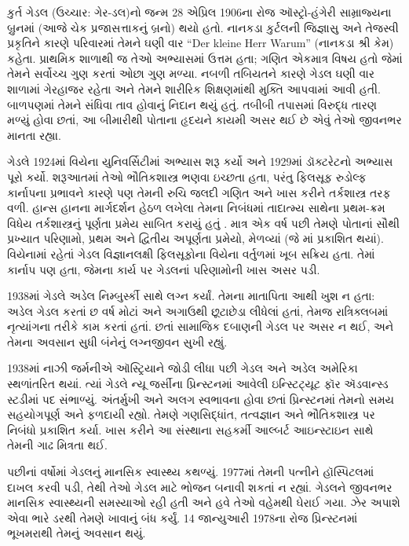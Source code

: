 \begingroup
\makeatletter{}\makeatother


\label{guunit:OLP-0625}



કુર્ત ગેડલ (ઉચ્ચાર: ગેર-ડલ)નો જન્મ 28 એપ્રિલ
1906ના રોજ ઑસ્ટ્રો-હંગેરી સામ્રાજ્યના બ્રુનમાં
(આજે ચેક પ્રજાસત્તાકનું બ્રનો) થયો હતો. નાનકડા
કુર્ટલની જિજ્ઞાસુ અને તેજસ્વી પ્રકૃતિને કારણે
પરિવારમાં તેમને ઘણી વાર “Der kleine Herr Warum”
(નાનકડા શ્રી કેમ) કહેતા. પ્રાથમિક શાળાથી જ
તેઓ અભ્યાસમાં ઉત્તમ હતા; ગણિત એકમાત્ર વિષય
હતો જેમાં તેમને સર્વોચ્ચ ગુણ કરતાં ઓછા ગુણ
મળ્યા. નબળી તબિયતને કારણે ગેડલ ઘણી વાર
શાળામાં ગેરહાજર રહેતા અને તેમને શારીરિક
શિક્ષણમાંથી મુક્તિ આપવામાં આવી હતી. બાળપણમાં
તેમને સંધિવા તાવ હોવાનું નિદાન થયું હતું.
તબીબી તપાસમાં વિરુદ્ધ તારણ મળ્યું હોવા
છતાં, આ બીમારીથી પોતાના હૃદયને કાયમી
અસર થઈ છે એવું તેઓ જીવનભર માનતા રહ્યા.

ગેડલે 1924માં વિયેના યુનિવર્સિટીમાં અભ્યાસ
શરૂ કર્યો અને 1929માં ડૉક્ટરેટનો અભ્યાસ
પૂરો કર્યો. શરૂઆતમાં તેઓ ભૌતિકશાસ્ત્ર
ભણવા ઇચ્છતા હતા, પરંતુ ફિલસૂફ રુડોલ્ફ
કાર્નાપના પ્રભાવને કારણે પણ તેમની રુચિ
જલદી ગણિત અને ખાસ કરીને તર્કશાસ્ત્ર તરફ
વળી. હાન્સ હાનના માર્ગદર્શન હેઠળ લખેલા
તેમના નિબંધમાં તાદાત્મ્ય સાથેના પ્રથમ-ક્રમ
વિધેય તર્કશાસ્ત્રનું પૂર્ણતા પ્રમેય સાબિત
કરાયું હતું \citep{Godel1929}. માત્ર એક
વર્ષ પછી તેમણે પોતાનાં સૌથી પ્રખ્યાત
પરિણામો, પ્રથમ અને દ્વિતીય અપૂર્ણતા
પ્રમેયો, મેળવ્યાં (જે
\citealt{Godel1931}માં પ્રકાશિત થયાં).
વિયેનામાં રહેતાં ગેડલ વિજ્ઞાનલક્ષી
ફિલસૂફોના વિયેના વર્તુળમાં ખૂબ સક્રિય
હતા. તેમાં કાર્નાપ પણ હતા, જેમના
કાર્ય પર ગેડલનાં પરિણામોની ખાસ અસર પડી.

1938માં ગેડલે અડેલ નિમ્બુર્સ્કી સાથે
લગ્ન કર્યાં. તેમના માતાપિતા આથી ખુશ
ન હતા: અડેલ ગેડલ કરતાં છ વર્ષ મોટાં
અને અગાઉથી છૂટાછેડા લીધેલાં હતાં,
તેમજ રાત્રિક્લબમાં નૃત્યાંગના તરીકે
કામ કરતાં હતાં. છતાં સામાજિક દબાણની
ગેડલ પર અસર ન થઈ, અને તેમના
અવસાન સુધી બંનેનું લગ્નજીવન સુખી રહ્યું.

1938માં નાઝી જર્મનીએ ઑસ્ટ્રિયાને
જોડી લીધા પછી ગેડલ અને અડેલ
અમેરિકા સ્થળાંતરિત થયાં. ત્યાં ગેડલે
ન્યૂ જર્સીના પ્રિન્સ્ટનમાં આવેલી
ઇન્સ્ટિટ્યૂટ ફૉર ઍડવાન્સ્ડ સ્ટડીમાં
પદ સંભાળ્યું. અંતર્મુખી અને
અલગ સ્વભાવના હોવા છતાં પ્રિન્સ્ટનમાં
તેમનો સમય સહયોગપૂર્ણ અને ફળદાયી રહ્યો.
તેમણે ગણસિદ્ધાંત, તત્વજ્ઞાન અને
ભૌતિકશાસ્ત્ર પર નિબંધો પ્રકાશિત કર્યા.
ખાસ કરીને આ સંસ્થાના સહકર્મી
આલ્બર્ટ આઇન્સ્ટાઇન સાથે તેમની
ગાઢ મિત્રતા થઈ.

પછીનાં વર્ષોમાં ગેડલનું માનસિક સ્વાસ્થ્ય
કથળ્યું. 1977માં તેમની પત્નીને
હૉસ્પિટલમાં દાખલ કરવી પડી, તેથી
તેઓ ગેડલ માટે ભોજન બનાવી શકતાં
ન રહ્યાં.
ગેડલને જીવનભર માનસિક સ્વાસ્થ્યની
સમસ્યાઓ રહી હતી અને હવે તેઓ
વહેમથી ઘેરાઈ ગયા. ઝેર અપાશે
એવા ભારે ડરથી તેમણે ખાવાનું
બંધ કર્યું. 14 જાન્યુઆરી 1978ના
રોજ પ્રિન્સ્ટનમાં ભૂખમરાથી
તેમનું અવસાન થયું.

